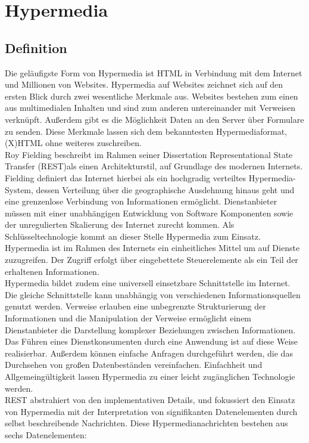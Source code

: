 \newpage
\section{Hypermedia}



\subsection{Definition}
Die geläufigste Form von Hypermedia ist HTML in Verbindung mit dem Internet und Millionen von Websites. Hypermedia auf Websites zeichnet sich auf den ersten Blick durch zwei wesentliche Merkmale aus. Websites bestehen zum einen aus multimedialen Inhalten und sind zum anderen untereinander mit Verweisen verknüpft. Außerdem gibt es die Möglichkeit Daten an den Server über Formulare zu senden. Diese Merkmale lassen sich dem bekanntesten Hypermediaformat, (X)HTML ohne weiteres zuschreiben.\\
Roy Fielding beschreibt im Rahmen seiner Dissertation Representational State Transfer (REST)als einen Architekturstil, auf Grundlage des modernen Internets. Fielding definiert das Internet hierbei als ein hochgradig verteiltes Hypermedia-System, dessen Verteilung über die geographische Ausdehnung hinaus geht und eine grenzenlose Verbindung von Informationen ermöglicht. Dienstanbieter müssen mit einer unabhängigen Entwicklung von Software Komponenten sowie der unregulierten Skalierung des Internet zurecht kommen. Als Schlüsseltechnologie kommt an dieser Stelle Hypermedia zum Einsatz. Hypermedia ist im Rahmen des Internets ein einheitliches Mittel um auf Dienste zuzugreifen. Der Zugriff erfolgt über eingebettete Steuerelemente als ein Teil der erhaltenen Informationen.\\
Hypermedia bildet zudem eine universell einsetzbare Schnittstelle im Internet. Die gleiche Schnittstelle kann unabhängig von verschiedenen Informationsquellen genutzt werden. Verweise erlauben eine unbegrenzte Strukturierung der Informationen und die Manipulation der Verweise ermöglicht einem Dienstanbieter die Darstellung komplexer Beziehungen zwischen Informationen. Das Führen eines Dienstkonsumenten durch eine Anwendung ist auf diese Weise realisierbar. Außerdem können einfache Anfragen durchgeführt werden, die das Durchsehen von großen Datenbeständen vereinfachen. Einfachheit und Allgemeingültigkeit lassen Hypermedia zu einer leicht zugänglichen Technologie werden. \\
REST abstrahiert von den implementativen Details, und fokussiert den Einsatz von Hypermedia mit der Interpretation von signifikanten Datenelementen durch selbst beschreibende Nachrichten. Diese  Hypermedianachrichten bestehen aus sechs Datenelementen:
